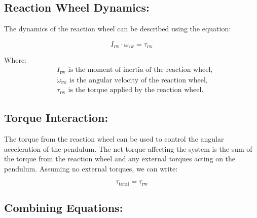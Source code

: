 \documentclass{article}
\begin{document}
\begin{multicols}{2}
    

\subsection{Reaction Wheel Dynamics:}

The dynamics of the reaction wheel can be described using the equation:

\[
I_{\text{rw}} \cdot \dot{\omega}_{\text{rw}} = \tau_{\text{rw}}
\]

Where:
\begin{align*}
&I_{\text{rw}} \text{ is the moment of inertia of the reaction wheel,} \\
&\dot{\omega}_{\text{rw}} \text{ is the angular velocity of the reaction wheel,} \\
&\tau_{\text{rw}} \text{ is the torque applied by the reaction wheel.}
\end{align*}

\subsection{Torque Interaction:}

The torque from the reaction wheel can be used to control the angular acceleration of the pendulum. The net torque affecting the system is the sum of the torque from the reaction wheel and any external torques acting on the pendulum. Assuming no external torques, we can write:

\[
\tau_{\text{total}} = \tau_{\text{rw}}
\]

\subsection{Combining Equations:}


\end{multicols}
\end{document}
